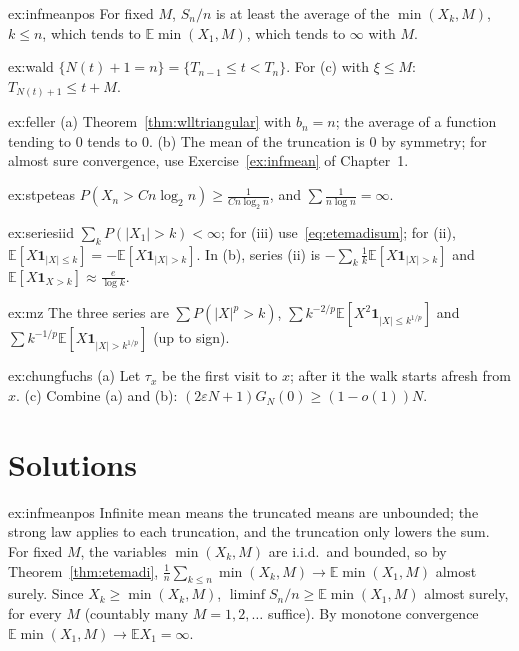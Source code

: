 \begin{hint}{ex:infmeanpos}
For fixed $M$, $S_n/n$ is at least the average of the $\min(X_k,M)$, $k\le n$, which tends to $\mathbb E\min(X_1,M)$, which tends to $\infty$ with $M$.
\end{hint}
\begin{hint}{ex:wald}
$\{N(t)+1=n\}=\{T_{n-1}\le t<T_n\}$. For (c) with $\xi\le M$: $T_{N(t)+1}\le t+M$.
\end{hint}
\begin{hint}{ex:feller}
(a) Theorem~\ref{thm:wlltriangular} with $b_n=n$; the average of a function tending to $0$ tends to $0$. (b) The mean of the truncation is $0$ by symmetry;
for almost sure convergence, use Exercise~\ref{ex:infmean} of Chapter~1.
\end{hint}
\begin{hint}{ex:stpeteas}
$P(X_n>Cn\log_2n)\ge\frac1{Cn\log_2n}$, and $\sum\frac1{n\log n}=\infty$.
\end{hint}
\begin{hint}{ex:seriesiid}
$\sum_kP(|X_1|>k)<\infty$; for (iii) use~\eqref{eq:etemadisum}; for (ii), $\mathbb E[X\mathbf 1_{|X|\le k}]=-\mathbb E[X\mathbf 1_{|X|>k}]$. In (b), series (ii)
is $-\sum_k\frac1k\mathbb E[X\mathbf 1_{|X|>k}]$ and $\mathbb E[X\mathbf 1_{X>k}]\approx\frac e{\log k}$.
\end{hint}
\begin{hint}{ex:mz}
The three series are $\sum P(|X|^p>k)$, $\sum k^{-2/p}\mathbb E[X^2\mathbf 1_{|X|\le k^{1/p}}]$ and $\sum k^{-1/p}\mathbb E[X\mathbf 1_{|X|>k^{1/p}}]$ (up to sign).
\end{hint}
\begin{hint}{ex:chungfuchs}
(a) Let $\tau_x$ be the first visit to $x$; after it the walk starts afresh from $x$. (c) Combine (a) and (b): $(2\varepsilon N+1)G_N(0)\ge(1-o(1))N$.
\end{hint}

\section{Solutions}

\begin{solution}{ex:infmeanpos}
\idea Infinite mean means the truncated means are unbounded; the strong law applies to each truncation, and the truncation only lowers the sum.
\writeup For fixed $M$, the variables $\min(X_k,M)$ are i.i.d.\ and bounded, so by Theorem~\ref{thm:etemadi}, $\frac1n\sum_{k\le n}\min(X_k,M)\to\mathbb E\min(X_1,M)$
almost surely. Since $X_k\ge\min(X_k,M)$, $\liminf S_n/n\ge\mathbb E\min(X_1,M)$ almost surely, for every $M$ (countably many $M=1,2,\dots$ suffice). By monotone
convergence $\mathbb E\min(X_1,M)\to\mathbb E X_1=\infty$.
\end{solution}

